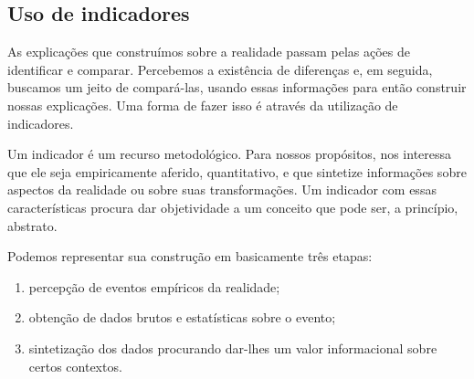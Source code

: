 \subsection{Uso de indicadores}

As explicações que construímos sobre a realidade passam pelas ações de identificar e comparar. Percebemos a existência de diferenças e, em seguida, buscamos um jeito de compará-las, usando essas informações para então construir nossas explicações. Uma forma de fazer isso é através da utilização de indicadores. 


Um indicador é um recurso metodológico. Para nossos propósitos, nos interessa que ele seja empiricamente aferido, quantitativo, e que sintetize informações sobre aspectos da realidade ou sobre suas transformações. Um indicador com essas características procura dar objetividade a um conceito que pode ser, a princípio, abstrato.


Podemos representar sua construção em basicamente três etapas:

\begin{enumerate}[label=\titem{\arabic* -}]
\item percepção de eventos empíricos da realidade;
\item obtenção de dados brutos e estatísticas sobre o evento;
\item sintetização dos dados procurando dar-lhes um valor informacional sobre certos contextos.
\end{enumerate}

\begin{figure}[H]
\centering


\end{figure}


